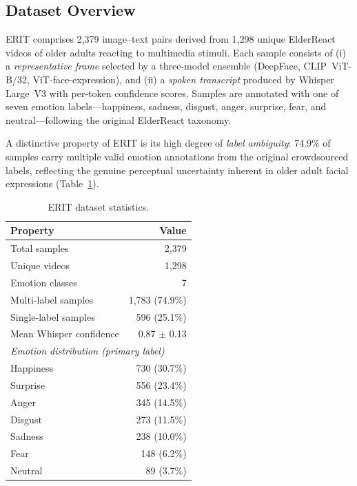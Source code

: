 

\subsection{Dataset Overview}
\label{sec:dataset}

ERIT comprises 2{,}379 image--text pairs derived from 1{,}298 unique
ElderReact~\cite{ma2019elderreact} videos of older adults reacting to
multimedia stimuli.  Each sample consists of (i) a \emph{representative frame}
selected by a three-model ensemble (DeepFace, CLIP~ViT-B/32,
ViT-face-expression), and (ii) a \emph{spoken transcript} produced by Whisper
Large~V3 with per-token confidence scores.  Samples are annotated with one of
seven emotion labels---happiness, sadness, disgust, anger, surprise, fear, and
neutral---following the original ElderReact taxonomy.

A distinctive property of ERIT is its high degree of \emph{label ambiguity}:
74.9\% of samples carry multiple valid emotion annotations from the original
crowdsourced labels, reflecting the genuine perceptual uncertainty inherent in
older adult facial expressions (Table~\ref{tab:dataset}).

\begin{table}[t]
\centering
\caption{ERIT dataset statistics.}
\label{tab:dataset}
\begin{tabular}{lr}
\toprule
\textbf{Property} & \textbf{Value} \\
\midrule
Total samples             & 2{,}379 \\
Unique videos             & 1{,}298 \\
Emotion classes           & 7 \\
Multi-label samples       & 1{,}783 (74.9\%) \\
Single-label samples      &   596 (25.1\%) \\
Mean Whisper confidence   & 0.87 $\pm$ 0.13 \\
\midrule
\multicolumn{2}{l}{\textit{Emotion distribution (primary label)}} \\
\quad Happiness            & 730 (30.7\%) \\
\quad Surprise             & 556 (23.4\%) \\
\quad Anger                & 345 (14.5\%) \\
\quad Disgust              & 273 (11.5\%) \\
\quad Sadness              & 238 (10.0\%) \\
\quad Fear                 & 148 \phantom{0}(6.2\%) \\
\quad Neutral              &  89 \phantom{0}(3.7\%) \\
\bottomrule
\end{tabular}
\end{table}


